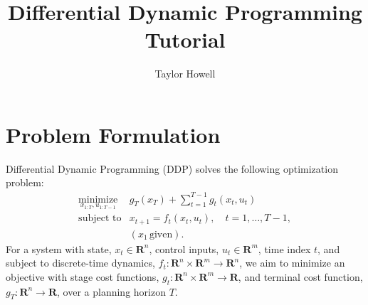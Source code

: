 \documentclass[12pt]{article}
\title{Differential Dynamic Programming Tutorial}
\author{Taylor Howell}
\begin{document}
\maketitle

\section{Problem Formulation}
Differential Dynamic Programming (DDP) solves the following optimization problem:
\begin{equation}
\begin{array}{ll}
\underset{x_{1:T}, u_{1:T-1}}{\mbox{minimize}} & g_T(x_T) + \sum \limits_{t = 1}^{T-1} g_t(x_t, u_t) \label{ddp_problem}\\
\mbox{subject to} & x_{t+1} = f_t(x_t,u_t), \quad t = 1,\dots,T-1,\\
& (x_1\,\mbox{given}).
\end{array}
\end{equation}
For a system with state, $x_t \in \mathbf{R}^{n}$, control inputs, $u_t \in \mathbf{R}^{m}$, time index $t$, and subject to discrete-time dynamics, $f_t : \mathbf{R}^n \times \mathbf{R}^m \rightarrow \mathbf{R}^n$, we aim to minimize an objective with stage cost functions, $g_t: \mathbf{R}^n \times \mathbf{R}^m \rightarrow \mathbf{R}$, and terminal cost function, $g_T: \mathbf{R}^n \rightarrow \mathbf{R}$, over a planning horizon $T$.
\end{document}
